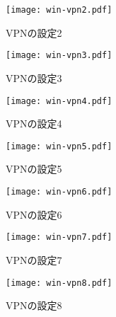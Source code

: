 \begin{figure}[htbp]
 \begin{center}
  \texttt{[image: win-vpn2.pdf]}
 \end{center}
 \caption{VPNの設定2}
 \label{winvpn2}
\end{figure}

\begin{figure}[htbp]
 \begin{center}
  \texttt{[image: win-vpn3.pdf]}
 \end{center}
 \caption{VPNの設定3}
 \label{winvpn3}
\end{figure}

\begin{figure}[htbp]
 \begin{center}
  \texttt{[image: win-vpn4.pdf]}
 \end{center}
 \caption{VPNの設定4}
 \label{winvpn4}
\end{figure}

\begin{figure}[htbp]
 \begin{center}
  \texttt{[image: win-vpn5.pdf]}
 \end{center}
 \caption{VPNの設定5}
 \label{winvpn5}
\end{figure}

\begin{figure}[htbp]
 \begin{center}
  \texttt{[image: win-vpn6.pdf]}
 \end{center}
 \caption{VPNの設定6}
 \label{winvpn6}
\end{figure}

\begin{figure}[htbp]
 \begin{center}
  \texttt{[image: win-vpn7.pdf]}
 \end{center}
 \caption{VPNの設定7}
 \label{winvpn7}
\end{figure}

\begin{figure}[htbp]
 \begin{center}
  \texttt{[image: win-vpn8.pdf]}
 \end{center}
 \caption{VPNの設定8}
 \label{winvpn8}
\end{figure}